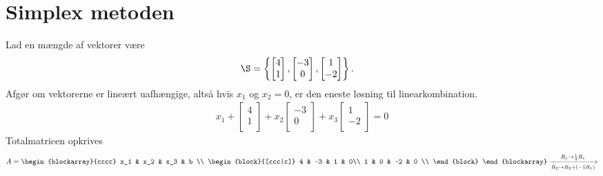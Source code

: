 \chapter{Simplex metoden}
\begin{eks}\label{lineu}
Lad en mængde af vektorer være
\begin{align*}
\S &= \left\{
\begin{bmatrix}
           4 \\
           1 \\
\end{bmatrix}
,
\begin{bmatrix}
           -3 \\
           0 \\
\end{bmatrix}
,
\begin{bmatrix}
           1 \\
           -2 \\
\end{bmatrix}
\right\}.
\end{align*}
\noindent
Afgør om vektorerne er lineært uafhængige, altså hvis $x_1$ og $x_2 = 0$, er den eneste løsning til linearkombination.
\begin{align*}
x_1+
\begin{bmatrix}
           4 \\
           1 \\
\end{bmatrix}
+ x_2
\begin{bmatrix}
           -3 \\
           0 \\
\end{bmatrix}
+ x_3
\begin{bmatrix}
           1 \\
           -2 \\
\end{bmatrix}
=0 
\end{align*}
%
Totalmatricen opkrives 
\noindent
\begin{align*}
A=
\begin{blockarray}{cccc}
x_1 & x_2 & x_3 & b \\
\begin{block}{[ccc|c]}
4 & -3 & 1 & 0\\
1 & 0 & -2 & 0 \\
\end{block}
\end{blockarray}
\xrightarrow[R_2 \rightarrow R_2+(-1R_1)]{R_1 \rightarrow \frac{1}{4}R_1} 

\end{align*}
\end{eks}
